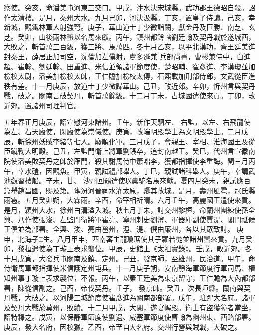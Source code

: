 \begin{pinyinscope}
 察使。癸亥，命潘美屯河東三交口。甲戌，汴水決宋城縣。武功郡王德昭自殺。詔作太清樓。是月，秦州大水。九月己卯，河決汲縣。丁亥，置皇子侍讀。己亥，幸新城，觀鐵林軍人射強弩。庚子，華山道士丁少微詣闕，獻金丹及巨勝、南芝、玄芝。癸卯，山後兩林蠻以名馬來獻。丙午，鎮州都鈐轄劉廷翰及契丹戰於遂城西，大敗之，斬首萬三百級，獲三將、馬萬匹。冬十月乙亥，以平北漢功，齊王廷美進封秦王，薛居正加司空，沈倫加左僕射，盧多遜兼
 兵部尚書，曹彬兼侍中，白進超、崔翰、劉廷翰、田重進、米信並領諸軍節度使，楚昭輔、崔彥進、李漢瓊並加檢校太尉，潘美加檢校太師，王仁贍加檢校太傅，石熙載加刑部侍郎，文武從臣進秩有差。十一月庚辰，放道士丁少微歸華山。己丑，畋近郊。辛卯，忻州言與契丹戰，破之。關南言破契丹，斬首萬餘級。十二月丁未，占城國遣使來貢。丁卯，畋近郊。置諸州司理判官。



 五年春正月庚辰，詔宣慰河東諸州。壬午，新作天駟左、
 右監，以左、右飛龍使為左、右天廄使，閑廄使為崇儀使。庚寅，改端明殿學士為文明殿學士。二月戊辰，斬徐州妖賊李緒等七人。廢順化軍。三月戊子，會親王、宰相、淮海國王及從臣蹴鞠大明殿。己丑，左監門衛上將軍劉鋹卒，追封南越王。癸巳，代州言宣徽南院使潘美敗契丹之師於雁門，殺其駙馬侍中蕭咄李，獲都指揮使李重誨。閏三月丙午，幸水磑，因觀魚。甲寅，親試禮部舉人。丁巳，親試諸科舉人。庚午，幸講武池觀習樓船。辛未，甘、
 沙州回鶻遣使以橐駝名馬來獻。夏四月癸未，親試應百篇舉趙昌國，賜及第。壅汾河晉祠水灌太原，隳其故城。是月，壽州風雹，冠氏縣雨雹。五月癸卯朔，大霖雨。辛酉，命宰相祈晴。六月壬午，高麗國王遣使來貢。是月，穎州大水，徐州白溝溢入城。秋七月丁未，討交州黎桓，命蘭州團練使孫全興、八作使張浚、左監門衛將軍崔亮、寧州刺史劉澄、軍器庫副使賈湜、閣門祗候王僎並為部署。全興、浚、亮由邕州，澄、湜、僎由廉州，各以其眾致討。
 庚申，北海孑□生。八月甲申，西南蕃主龍瓊琚使其子羅若從並諸州蠻來貢。九月癸卯，黎桓遣使為丁璇上表求襲位。甲辰，史館上《太祖實錄》。壬戌，畋近郊。冬十月戊寅，大發兵屯關南及鎮、定州。己丑，發京師，至雄州，民治道。甲午，命侍衛馬軍都指揮使米信護定州屯兵。十一月庚子朔，安南靜海軍節度行軍司馬、權知州事丁璇上表求襲位，不報。丙午，以秦王廷美為東京留守，王仁贍為大內都部署，陳從信副之。己酉，帝伐契丹。壬子，
 發京師。癸丑，次長垣縣。關南與契丹戰，大破之。以河陽三城節度使崔彥進為關南都部署。戊午，駐蹕大名府。諸軍及契丹大戰於莫州，敗績。十二月甲戌，大閱，遂宴幄殿。衛士有盜獲獐者當坐，詔特釋之。戊寅，以保靜軍節度使劉遇、威塞軍節度使曹翰為幽州東、西路部署。庚辰，發大名府，因校獵。乙酉，帝至自大名府。交州行營與賊戰，大破之。




\end{pinyinscope}
